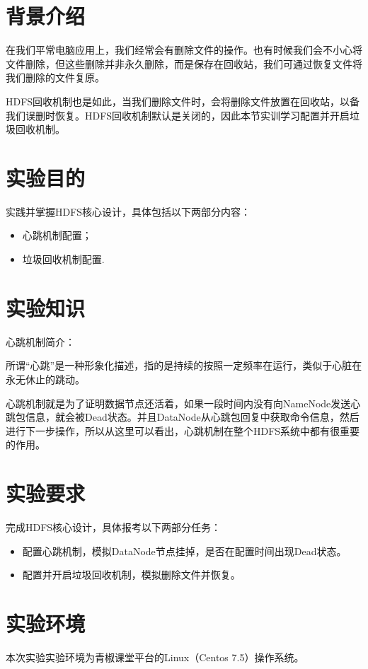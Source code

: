 \documentclass {article}
\begin{document}
	\maketitle{}
	\section{背景介绍}
		在我们平常电脑应用上，我们经常会有删除文件的操作。也有时候我们会不小心将文件删除，但这些删除并非永久删除，而是保存在回收站，我们可通过恢复文件将我们删除的文件复原。
		
		HDFS回收机制也是如此，当我们删除文件时，会将删除文件放置在回收站，以备我们误删时恢复。HDFS回收机制默认是关闭的，因此本节实训学习配置并开启垃圾回收机制。
	
	\section{实验目的}
		实践并掌握HDFS核心设计，具体包括以下两部分内容：
		\begin{itemize}
			\item 心跳机制配置；
			\item 垃圾回收机制配置.
		\end{itemize}
	
	\section{实验知识}	
		\noindent 心跳机制简介：
		
		所谓“心跳”是一种形象化描述，指的是持续的按照一定频率在运行，类似于心脏在永无休止的跳动。
			
		心跳机制就是为了证明数据节点还活着，如果一段时间内没有向NameNode发送心跳包信息，就会被Dead状态。并且DataNode从心跳包回复中获取命令信息，然后进行下一步操作，所以从这里可以看出，心跳机制在整个HDFS系统中都有很重要的作用。
	
	\section{实验要求}
		完成HDFS核心设计，具体报考以下两部分任务：
		\begin{itemize}
			\item 配置心跳机制，模拟DataNode节点挂掉，是否在配置时间出现Dead状态。
			\item 配置并开启垃圾回收机制，模拟删除文件并恢复。
		\end{itemize}
	
	\section{实验环境}
		本次实验实验环境为青椒课堂平台的Linux（Centos 7.5）操作系统。
	
\end{document}
